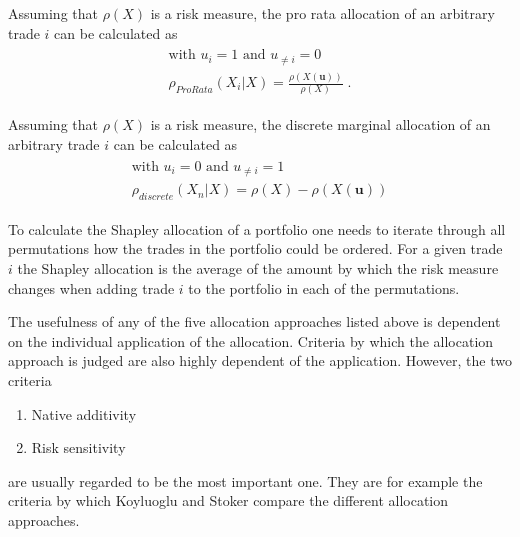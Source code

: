 \documentclass[../Thesis_AHoecherl.tex]{subfiles}
\begin{document}
\begin{definition}
    Assuming that $\rho\left(X\right)$ is a risk measure, the pro rata allocation of an arbitrary trade $i$ can be calculated as
    \begin{gather}
        \begin{split}
            \text{with } u_{i} = 1 \text{ and } u_{\neq i} = 0\\
            \rho_{ProRata}\left(X_i|X\right) = \frac{\rho(X(\mathbf{u}))}{\rho(X)} \; \text{.}
        \end{split}
    \end{gather}
\end{definition}

\begin{definition} 
    Assuming that $\rho(X)$ is a risk measure, the discrete marginal allocation of an arbitrary trade $i$ can be calculated as
    \begin{gather}
        \begin{split}
            \text{with } u_{i} = 0 \text{ and } u_{\neq i} = 1\\
            \rho_{discrete}\left(X_n|X\right) = \rho\left(X\right) - \rho\left(X\left(\mathbf{u}\right)\right)    
        \end{split}
    \end{gather}
\end{definition}

\begin{definition}
To calculate the Shapley allocation of a portfolio one needs to iterate through all permutations how the trades in the portfolio could be ordered.
For a given trade $i$ the Shapley allocation is the average of the amount by which the risk measure changes when adding trade $i$ to the portfolio in each of the permutations.
\end{definition}

The usefulness of any of the five allocation approaches listed above is dependent on the individual application of the allocation. Criteria by which the allocation approach is judged are also highly dependent of the application. However, the two criteria
\begin{enumerate}
    \item Native additivity
    \item Risk sensitivity
\end{enumerate}
are usually regarded to be the most important one. They are for example the criteria by which Koyluoglu and Stoker \cite{koyluoglu2002risk} compare the different allocation approaches.
\end{document}
